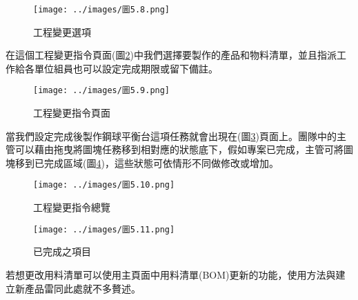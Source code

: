 \begin{figure}[h!]
\centering
\texttt{[image: ../images/圖5.8.png]}
\caption{工程變更選項}\label{工程變更選項}
\end{figure}

在這個工程變更指令頁面(圖\ref{工程變更指令頁面})中我們選擇要製作的產品和物料清單，並且指派工作給各單位組員也可以設定完成期限或留下備註。\\

\begin{figure}[h!]
\centering
\texttt{[image: ../images/圖5.9.png]}
\caption{工程變更指令頁面}\label{工程變更指令頁面}
\end{figure}

當我們設定完成後製作鋼球平衡台這項任務就會出現在(圖\ref{工程變更指令總覽})頁面上。團隊中的主管可以藉由拖曳將圖塊任務移到相對應的狀態底下，假如專案已完成，主管可將圖塊移到已完成區域(圖\ref{已完成之項目})，這些狀態可依情形不同做修改或增加。\\


\begin{figure}[h!]
\centering
\texttt{[image: ../images/圖5.10.png]}
\caption{工程變更指令總覽}\label{工程變更指令總覽}
\end{figure}


\begin{figure}[h!]
\centering
\texttt{[image: ../images/圖5.11.png]}
\caption{已完成之項目}\label{已完成之項目}
\end{figure}

若想更改用料清單可以使用主頁面中用料清單(BOM)更新的功能，使用方法與建立新產品雷同此處就不多贅述。

\newpage